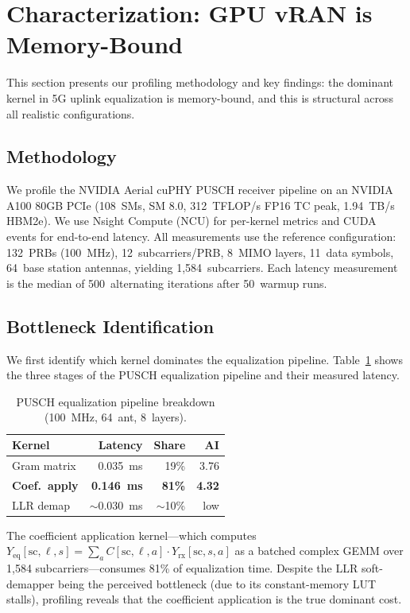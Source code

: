 \section{Characterization: GPU vRAN is Memory-Bound}
\label{sec:characterization}

This section presents our profiling methodology and key findings: the dominant kernel in 5G uplink equalization is memory-bound, and this is structural across all realistic configurations.

\subsection{Methodology}

We profile the NVIDIA Aerial cuPHY PUSCH receiver pipeline on an NVIDIA A100 80GB PCIe (108~SMs, SM 8.0, 312~TFLOP/s FP16 TC peak, 1.94~TB/s HBM2e). We use Nsight Compute (NCU) for per-kernel metrics and CUDA events for end-to-end latency. All measurements use the reference configuration: 132~PRBs (100~MHz), 12~subcarriers/PRB, 8~MIMO layers, 11~data symbols, 64~base station antennas, yielding 1,584~subcarriers. Each latency measurement is the median of 500~alternating iterations after 50~warmup runs.

\subsection{Bottleneck Identification}

We first identify which kernel dominates the equalization pipeline. Table~\ref{tab:bottleneck} shows the three stages of the PUSCH equalization pipeline and their measured latency.

\begin{table}[h]
\centering
\small
\caption{PUSCH equalization pipeline breakdown (100~MHz, 64~ant, 8~layers).}
\label{tab:bottleneck}
\begin{tabular}{@{}lrrr@{}}
\toprule
Kernel & Latency & Share & AI \\
\midrule
Gram matrix & 0.035~ms & 19\% & 3.76 \\
\textbf{Coef.\ apply} & \textbf{0.146~ms} & \textbf{81\%} & \textbf{4.32} \\
LLR demap & $\sim$0.030~ms & $\sim$10\% & low \\
\bottomrule
\end{tabular}
\end{table}

The coefficient application kernel---which computes $Y_{\text{eq}}[\text{sc}, \ell, s] = \sum_{a} C[\text{sc}, \ell, a] \cdot Y_{\text{rx}}[\text{sc}, s, a]$ as a batched complex GEMM over 1,584 subcarriers---consumes 81\% of equalization time. Despite the LLR soft-demapper being the perceived bottleneck (due to its constant-memory LUT stalls), profiling reveals that the coefficient application is the true dominant cost.

